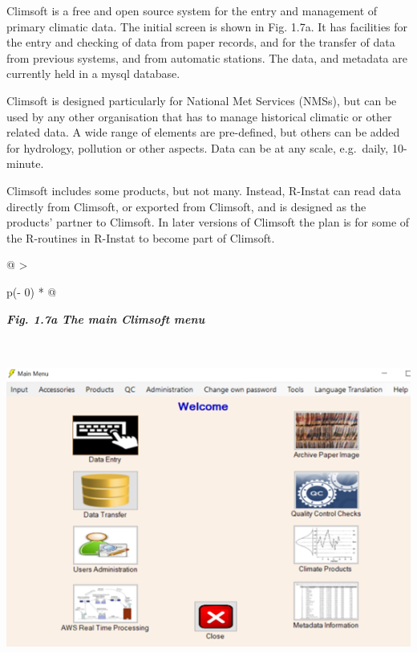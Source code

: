 \documentclass[
  letterpaper,
  DIV=11,
  numbers=noendperiod]{scrreprt}
\begin{document}
Climsoft is a free and open source system for the entry and management
of primary climatic data. The initial screen is shown in Fig. 1.7a. It
has facilities for the entry and checking of data from paper records,
and for the transfer of data from previous systems, and from automatic
stations. The data, and metadata are currently held in a mysql database.

Climsoft is designed particularly for National Met Services (NMSs), but
can be used by any other organisation that has to manage historical
climatic or other related data. A wide range of elements are
pre-defined, but others can be added for hydrology, pollution or other
aspects. Data can be at any scale, e.g.~daily, 10-minute.

Climsoft includes some products, but not many. Instead, R-Instat can
read data directly from Climsoft, or exported from Climsoft, and is
designed as the products' partner to Climsoft. In later versions of
Climsoft the plan is for some of the R-routines in R-Instat to become
part of Climsoft.

\begin{longtable}[]{@{}
  >{\raggedright\arraybackslash}p{(\columnwidth - 0\tabcolsep) * }@{}}
\toprule\noalign{}
\begin{minipage}[b]{\linewidth}\raggedright
\textbf{\emph{Fig. 1.7a The main Climsoft menu}}
\end{minipage} \\
\midrule\noalign{}
\endhead
\bottomrule\noalign{}
\endlastfoot
\includegraphics[width=5.75635in,height=3.96937in]{figures/Fig1.7a.png} \\
\end{longtable}
\end{document}
